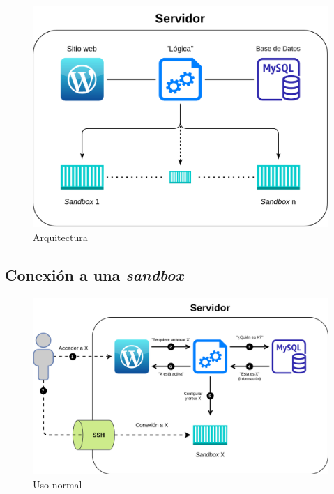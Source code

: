         \begin{figure}[h]
            \centering
            \includegraphics[scale=0.20]{images/Diagramas/Arquitectura.png}
            \caption{Arquitectura}
            \label{fig:arquitectura}
        \end{figure}
        
        \subsection{Conexión a una \textit{sandbox}}
        
        \begin{figure}[h]
            \centering
            \includegraphics[scale=0.20]{images/Diagramas/Arquitectura 1.png}
            \caption{Uso normal}
            \label{fig:conexion-sandbox}
        \end{figure}
        
